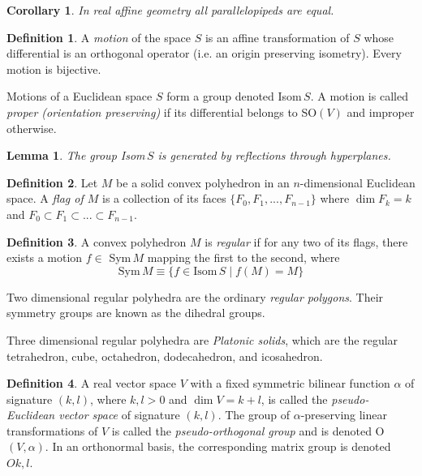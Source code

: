 \documentclass{article}
\newtheorem{lemma}[theorem]{Lemma}
\newtheorem{corollary}{Corollary}[theorem]
\theoremstyle{remark}
\theoremstyle{definition}
\newtheorem{definition}{Definition}[section]
\begin{document}
\begin{corollary}
In real affine geometry all parallelopipeds are equal. 
\end{corollary}

\begin{definition}
A \textit{motion} of the space $S$ is an affine transformation of $S$ whose differential is an orthogonal operator (i.e. an origin preserving isometry). Every motion is bijective. 
\end{definition}

Motions of a Euclidean space $S$ form a group denoted Isom$\,S$. A motion is called \textit{proper (orientation preserving)} if its differential belongs to SO$(V)$ and improper otherwise. 

\begin{lemma}
The group Isom$\,S$ is generated by reflections through hyperplanes. 
\end{lemma}

\begin{definition}
Let $M$ be a solid convex polyhedron in an $n$-dimensional Euclidean space. A \textit{flag of $M$} is a collection of its faces $\{F_0, F_1, ..., F_{n-1}\}$ where $\dim{F_k} = k$ and $F_0 \subset F_1 \subset ... \subset F_{n-1}$. 
\end{definition}

\begin{definition}
A convex polyhedron $M$ is \textit{regular} if for any two of its flags, there exists a motion $f \in$ Sym$\,M$ mapping the first to the second, where 
\[\text{Sym}\,M \equiv \{f \in \text{Isom}\,S \;|\; f(M) = M \}\]
\end{definition}

Two dimensional regular polyhedra are the ordinary \textit{regular polygons}. Their symmetry groups are known as the dihedral groups.

Three dimensional regular polyhedra are \textit{Platonic solids}, which are the regular tetrahedron, cube, octahedron, dodecahedron, and icosahedron. 

\begin{definition}
A real vector space $V$ with a fixed symmetric bilinear function $\alpha$ of signature $(k, l)$, where $k, l > 0$ and $\dim{V} = k+l$, is called the \textit{pseudo-Euclidean vector space} of signature $(k, l)$. The group of $\alpha$-preserving linear transformations of $V$ is called the \textit{pseudo-orthogonal group} and is denoted O$(V, \alpha)$. In an orthonormal basis, the corresponding matrix group is denoted $O{k,l}$. 
\end{definition}
\end{document}
